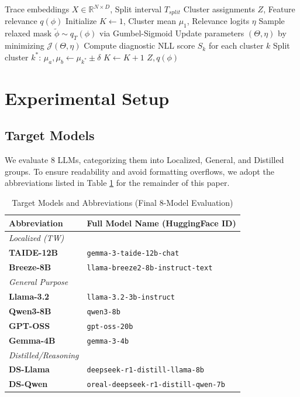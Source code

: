 \documentclass[conference]{IEEEtran}
\begin{document}
\begin{algorithm}[h]
\caption{DIVI Dynamic Clustering for Red Teaming \cite{anonymous2025divi}}
\label{alg:divi}
\begin{algorithmic}[1]
\REQUIRE Trace embeddings $X \in \mathbb{R}^{N \times D}$, Split interval $T_{split}$
\ENSURE Cluster assignments $Z$, Feature relevance $q(\phi)$
\STATE Initialize $K \leftarrow 1$, Cluster mean $\mu_1$, Relevance logits $\eta$
    \STATE Sample relaxed mask $\tilde{\phi} \sim q_T(\phi)$ via Gumbel-Sigmoid
    \STATE Update parameters $(\Theta, \eta)$ by minimizing $\mathcal{J}(\Theta, \eta)$
        \STATE Compute diagnostic NLL score $S_k$ for each cluster $k$
            \STATE Split cluster $k^*$: $\mu_a, \mu_b \leftarrow \mu_{k^*} \pm \delta$
            \STATE $K \leftarrow K + 1$
        \ENDIF
    \ENDIF
\ENDFOR
\RETURN $Z, q(\phi)$
\end{algorithmic}
\end{algorithm}

\section{Experimental Setup}
\subsection{Target Models}
We evaluate 8 LLMs, categorizing them into Localized, General, and Distilled groups. To ensure readability and avoid formatting overflows, we adopt the abbreviations listed in Table \ref{tab:model_mapping} for the remainder of this paper.

\begin{table}[h]
\centering
\footnotesize
\caption{Target Models and Abbreviations (Final 8-Model Evaluation)}
\label{tab:model_mapping}
\begin{tabularx}{\columnwidth}{l X}
\toprule
\textbf{Abbreviation} & \textbf{Full Model Name (HuggingFace ID)} \\
\midrule
\textit{Localized (TW)} & \\
\textbf{TAIDE-12B} & \texttt{gemma-3-taide-12b-chat} \\
\textbf{Breeze-8B} & \texttt{llama-breeze2-8b-instruct-text} \\
\midrule
\textit{General Purpose} & \\
\textbf{Llama-3.2} & \texttt{llama-3.2-3b-instruct} \\
\textbf{Qwen3-8B} & \texttt{qwen3-8b} \\
\textbf{GPT-OSS} & \texttt{gpt-oss-20b} \\
\textbf{Gemma-4B} & \texttt{gemma-3-4b} \\
\midrule
\textit{Distilled/Reasoning} & \\
\textbf{DS-Llama} & \texttt{deepseek-r1-distill-llama-8b} \\
\textbf{DS-Qwen} & \texttt{oreal-deepseek-r1-distill-qwen-7b} \\
\bottomrule
\end{tabularx}
\end{table}
\end{document}
